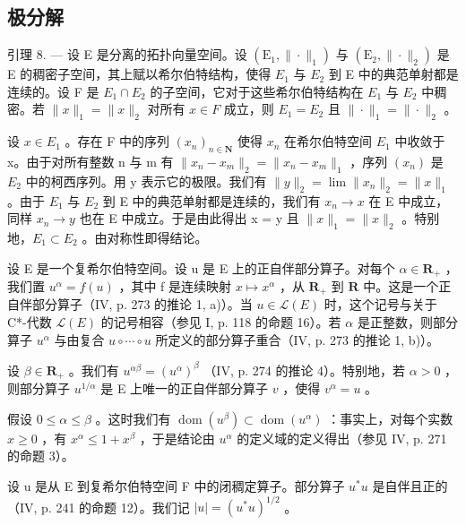 \subsection{极分解}

引理 8. --- 设 E 是分离的拓扑向量空间。设 \((\mathrm{E}_{1},\|\cdot\|_{1})\) 与 \((\mathrm{E}_{2},\|\cdot\|_{2})\) 是 E 的稠密子空间，其上赋以希尔伯特结构，使得 \(E_{1}\) 与 \(E_{2}\) 到 E 中的典范单射都是连续的。设 F 是 \(E_{1}\cap E_{2}\) 的子空间，它对于这些希尔伯特结构在 \(E_{1}\) 与 \(E_{2}\) 中稠密。若 \(\|x\|_{1}=\|x\|_{2}\) 对所有 \(x\in F\) 成立，则 \(E_{1}=E_{2}\) 且 \(\|\cdot\|_{1}=\|\cdot\|_{2}\) 。

设 \(x \in E_{1}\) 。存在 F 中的序列 \((x_{n})_{n \in \mathbf{N}}\) 使得 \(x_{n}\) 在希尔伯特空间 \(E_{1}\) 中收敛于 x。由于对所有整数 n 与 m 有 \(\|x_{n} - x_{m}\|_{2} = \|x_{n} - x_{m}\|_{1}\) ，序列 \((x_{n})\) 是 \(E_{2}\) 中的柯西序列。用 y 表示它的极限。我们有 \(\|y\|_{2} = \lim\|x_{n}\|_{2} = \|x\|_{1}\) 。由于 \(E_{1}\) 与 \(E_{2}\) 到 E 中的典范单射都是连续的，我们有 \(x_{n} \to x\) 在 E 中成立，同样 \(x_{n} \to y\) 也在 E 中成立。于是由此得出 x = y 且 \(\|x\|_{1} = \|x\|_{2}\) 。特别地，\(E_{1} \subset E_{2}\) 。由对称性即得结论。

设 E 是一个复希尔伯特空间。设 u 是 E 上的正自伴部分算子。对每个 \(\alpha \in \mathbf R_{+}\) ，我们置 \(u^{\alpha} = f(u)\) ，其中 f 是连续映射 \(x \mapsto x^{\alpha}\) ，从 \(\mathbf R_{+}\) 到 \(\mathbf R\) 中。这是一个正自伴部分算子（IV, p. 273 的推论 1, a)）。当 \(u \in \mathcal{L}(E)\) 时，这个记号与关于 C*-代数 \(\mathcal{L}(E)\) 的记号相容（参见 I, p. 118 的命题 16）。若 \(\alpha\) 是正整数，则部分算子 \(u^{\alpha}\) 与由复合 \(u \circ \cdots \circ u\) 所定义的部分算子重合（IV, p. 273 的推论 1, b)）。

设 \(\beta \in \mathbf{R}_{+}\) 。我们有 \(u^{\alpha \beta} = (u^{\alpha})^{\beta}\) （IV, p. 274 的推论 4）。特别地，若 \(\alpha > 0\) ，则部分算子 \(u^{1 / \alpha}\) 是 E 上唯一的正自伴部分算子 \(v\) ，使得 \(v^{\alpha} = u\) 。

假设 \(0 \leqslant \alpha \leqslant \beta\) 。这时我们有 \(\operatorname{dom}(u^{\beta}) \subset \operatorname{dom}(u^{\alpha})\) ：事实上，对每个实数 \(x \geqslant 0\) ，有 \(x^{\alpha} \leqslant 1 + x^{\beta}\) ，于是结论由 \(u^{\alpha}\) 的定义域的定义得出（参见 IV, p. 271 的命题 3）。

设 u 是从 E 到复希尔伯特空间 F 中的闭稠定算子。部分算子 \(u^{*}u\) 是自伴且正的（IV, p. 241 的命题 12）。我们记 \(|u| = (u^{*}u)^{1/2}\) 。

